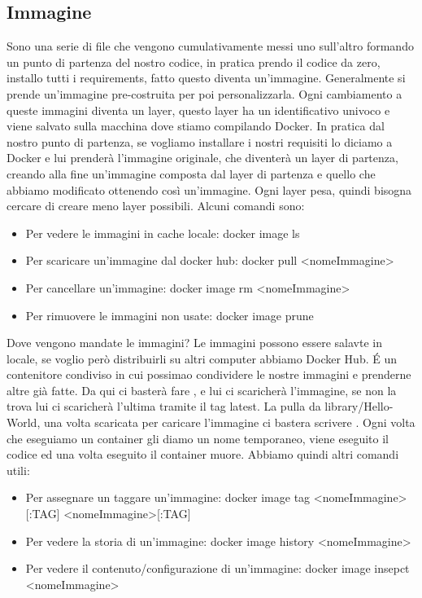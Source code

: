 \documentclass[a4paper,12pt]{article}
\begin{document}
\subsection{Immagine}
Sono una serie di file che vengono cumulativamente messi uno sull'altro formando un punto di partenza del nostro codice, in pratica prendo il codice da zero, installo tutti i requirements, fatto questo diventa un'immagine. Generalmente si prende un'immagine pre-costruita per poi personalizzarla.
Ogni cambiamento a queste immagini diventa un layer, questo layer ha un identificativo univoco e viene salvato sulla macchina dove stiamo compilando Docker. In pratica dal nostro punto di partenza, se vogliamo installare i nostri requisiti lo diciamo a Docker e lui prenderà l'immagine originale, che diventerà un layer di partenza,
creando alla fine un'immagine composta dal layer di partenza e quello che abbiamo modificato ottenendo così un'immagine.
Ogni layer pesa, quindi bisogna cercare di creare meno layer possibili.
\newline
Alcuni comandi sono:
\begin{itemize}
    \item Per vedere le immagini in cache locale: docker image ls
    \item Per scaricare un'immagine dal docker hub: docker pull <nomeImmagine>
    \item Per cancellare un'immagine: docker image rm <nomeImmagine>
    \item Per rimuovere le immagini non usate: docker image prune
\end{itemize}
Dove vengono mandate le immagini? Le immagini possono essere salavte in locale, se voglio però distribuirli su altri computer abbiamo Docker Hub. \'{E} un contenitore condiviso in cui possimao condividere le nostre immagini e prenderne altre già fatte.
Da qui ci basterà fare , e lui ci scaricherà l'immagine, se non la trova lui ci scaricherà l'ultima tramite il tag latest.
La pulla da library/Hello-World, una volta scaricata per caricare l'immagine ci bastera scrivere .
Ogni volta che eseguiamo un container gli diamo un nome temporaneo, viene eseguito il codice ed una volta eseguito il container muore.
\newline
Abbiamo quindi altri comandi utili:
\begin{itemize}
    \item Per assegnare un taggare un'immagine: docker image tag <nomeImmagine>[:TAG] <nomeImmagine>[:TAG]
    \item Per vedere la storia di un'immagine: docker image history <nomeImmagine>
    \item Per vedere il contenuto/configurazione di un'immagine: docker image insepct <nomeImmagine>
\end{itemize}
\end{document}
